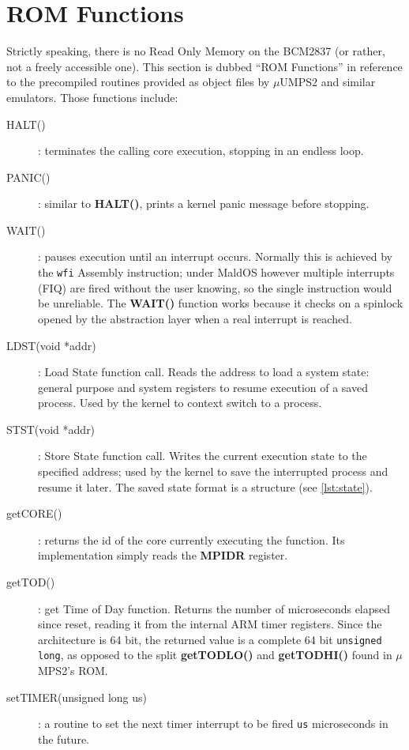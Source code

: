 \documentclass[12pt,a4paper,openright,twoside]{report}
\begin{document}
\section{ROM Functions}
Strictly speaking, there is no Read Only Memory on the BCM2837 (or rather, not a
freely accessible one). This section is 
dubbed ``ROM Functions'' in reference to the precompiled routines provided as 
object files by $\mu$UMPS2 and similar emulators.
Those functions include:
\begin{description}
    \item[HALT()]: terminates the calling core execution, stopping in an endless loop.
    \item[PANIC()]: similar to \textbf{HALT()}, prints a kernel panic message before
        stopping.
    \item[WAIT()]: pauses execution until an interrupt occurs. Normally this is 
        achieved by the {\tt wfi} Assembly instruction; under MaldOS however multiple
        interrupts (FIQ) are fired without the user knowing, so the single instruction
        would be unreliable. The \textbf{WAIT()} function works because it checks
        on a spinlock opened by the abstraction layer when a real interrupt is 
        reached.
    \item[LDST(void *addr)]: Load State function call. Reads the address to load
        a system state: general purpose and system registers to resume execution
        of a saved process. Used by the kernel to context switch to a process.
    \item[STST(void *addr)]: Store State function call. Writes the current execution
        state to the specified address; used by the kernel to save the interrupted
        process and resume it later. The saved state format is a structure (see
         \ref{lst:state}).
    \item[getCORE()]: returns the id of the core currently executing the function.
        Its implementation simply reads the \textbf{MPIDR} register.
    \item[getTOD()]: get Time of Day function. Returns the number of microseconds
        elapsed since reset, reading it from the internal ARM
        timer registers. Since the architecture is 64 bit, the returned value 
        is a complete 64 bit {\tt unsigned long}, as opposed to the split 
        \textbf{getTODLO()} and \textbf{getTODHI()} found in $\mu$MPS2's ROM.
    \item[setTIMER(unsigned long us)]: a routine to set the next timer interrupt to 
        be fired {\tt us} microseconds in the future.

\end{description}
\end{document}
